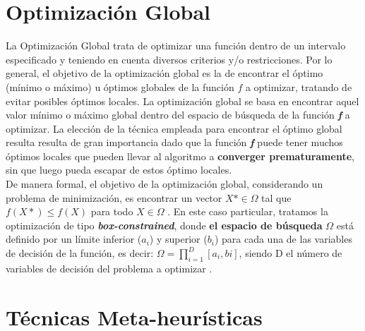 

\section{Optimización Global}
\label{sec:OPT}


La Optimización Global trata de optimizar una función dentro de un intervalo especificado y teniendo en cuenta diversos criterios y/o restricciones. Por lo general, el objetivo de la optimización global es la de encontrar el óptimo (mínimo o máximo) u óptimos globales de la función $f$ a optimizar, tratando de evitar posibles óptimos locales. 
La optimización global se basa en encontrar aquel valor mínimo o máximo global dentro del espacio de búsqueda de la función \textbf{\textit{f}} a optimizar. La elección de la técnica empleada para encontrar el óptimo global resulta resulta de gran importancia dado que la función \textbf{\textit{f}} puede tener muchos óptimos locales que pueden llevar al algoritmo a \textbf{converger prematuramente}, sin que luego pueda escapar de estos óptimo locales. \\
De manera formal, el objetivo de la optimización global, considerando un problema de minimización, es encontrar un vector $X* \in \Omega$ tal que $f(X*) \leq f(X)$ para todo $X \in \Omega$ \cite{Segredo2017}.
En este caso particular, tratamos la optimización de tipo \textbf{\textit{box-constrained}}, donde \textbf{el espacio de búsqueda} $\Omega$ está definido por un límite inferior ($a_{i}$) y superior ($b_{i}$) para cada una de las variables de decisión de la función, es decir: $\Omega = \prod^{D}_{i=1}[a_{i}, b{i}]$, siendo D el número de variables de decisión del problema a optimizar \cite{Segredo2017}.


\section{Técnicas Meta-heurísticas}
\label{sec:META}

